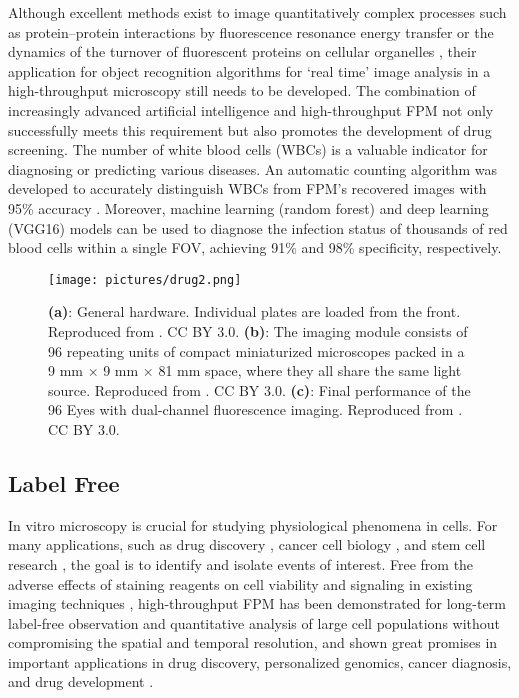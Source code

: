 \documentclass[journal,review,submit,pdftex,moreauthors]{Definitions/mdpi}
\begin{document}
Although excellent methods exist to image quantitatively complex processes such as protein–protein interactions by fluorescence resonance energy transfer\cite{erfle2004sirna, wouters2001imaging} or the dynamics of the turnover of fluorescent proteins on cellular organelles \cite{lippincott2001studying, rabut2004mapping, forster2006secretory}, their application for object recognition algorithms for ‘real time’ image analysis in a high-throughput microscopy still needs to be developed\cite{starkuviene2007potential}. The combination of increasingly advanced artificial intelligence and high-throughput FPM not only successfully meets this requirement but also promotes the development of drug screening. The number of white blood cells (WBCs) is a valuable indicator for diagnosing or predicting various diseases\cite{yarnell1991fibrinogen, kannel1992white, grimm1985prognostic, barron2000association, brown2001white, twig2012white}. An automatic counting algorithm was developed to accurately distinguish WBCs from FPM's recovered images with 95\% accuracy \cite{chung2015counting}. Moreover, machine learning (random forest) and deep learning (VGG16) models can be used to diagnose the infection status of thousands of red blood cells within a single FOV, achieving 91\% and 98\% specificity, respectively\cite{akcakir2022automated}.



\begin{figure}[H]
\texttt{[image: pictures/drug2.png]}
\caption{ \textbf{(a)}: General hardware. Individual plates are loaded from the front. Reproduced from \cite{pan2019situ}. CC BY 3.0. \textbf{(b)}: The imaging module consists of 96 repeating units of compact miniaturized microscopes packed in a 9 mm × 9 mm × 81 mm space, where they all share the same light source. Reproduced from \cite{pan2019situ}. CC BY 3.0. \textbf{(c)}: Final performance of the 96 Eyes with dual-channel fluorescence imaging. Reproduced from \cite{pan2019situ}. CC BY 3.0. \label{drug2}}
\end{figure}  


\subsection{Label Free}
In vitro microscopy is crucial for studying physiological phenomena in cells. For many applications, such as drug discovery \cite{lang2006cellular}, cancer cell biology \cite{boyd1995some}, and stem cell research \cite{costa2011continuous}, the goal is to identify and isolate events of interest. Free from the adverse effects of staining reagents on cell viability and signaling in existing imaging techniques \cite{zheng2011epetri, greenbaum2012imaging, greenbaum2014wide, luo2015synthetic, goda2009serial}, high-throughput FPM has been demonstrated for long-term label-free observation and quantitative analysis of large cell populations without compromising the spatial and temporal resolution, and shown great promises in important applications in drug discovery, personalized genomics, cancer diagnosis, and drug development \cite{lukosz1966optical, zheng2013wide, candes2008introduction}.
\end{document}
